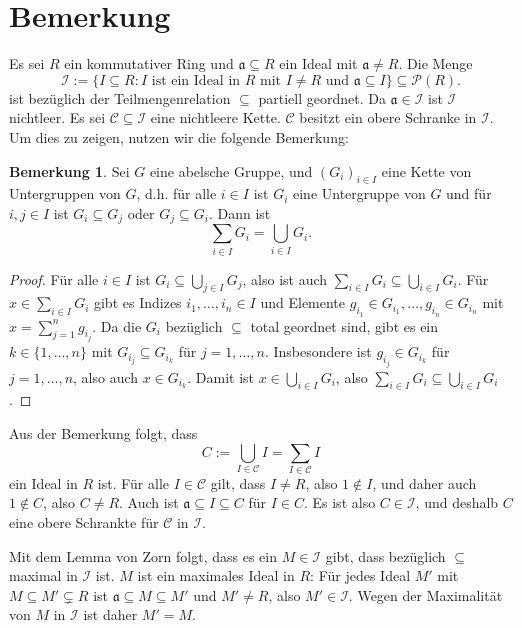 \documentclass[a4paper,10pt]{article}
\theoremstyle{definition}
\newtheorem{bem}[beh]{Bemerkung}
\newcommand{\mf}[1]{\mathfrak{#1}}
\newcommand{\mc}[1]{\mathcal{#1}}
\begin{document}
\section*{Bemerkung}
Es sei $R$ ein kommutativer Ring und $\mf{a} \subseteq R$ ein Ideal mit $\mf{a} \neq R$. Die Menge
\[
 \mc{I} := \{I \subseteq R : I \text{ ist ein Ideal in $R$ mit $I \neq R$ und $\mf{a} \subseteq I$} \} \subseteq \mc{P}(R).
\]
ist bezüglich der Teilmengenrelation $\subseteq$ partiell geordnet. Da $\mf{a} \in \mc{I}$ ist $\mc{I}$ nichtleer. Es sei $\mc{C} \subseteq \mc{I}$ eine nichtleere Kette. $\mc{C}$ besitzt ein obere Schranke in $\mc{I}$. Um dies zu zeigen, nutzen wir die folgende Bemerkung:

\begin{bem}
 Sei $G$ eine abelsche Gruppe, und $(G_i)_{i \in I}$ eine Kette von Untergruppen von $G$, d.h. für alle $i \in I$ ist $G_i$ eine Untergruppe von $G$ und für $i,j \in I$ ist $G_i \subseteq G_j$ oder $G_j \subseteq G_i$. Dann ist
 \[
  \sum_{i \in I} G_i = \bigcup_{i \in I} G_i.
 \]
\end{bem}
\begin{proof}
 Für alle $i \in I$ ist $G_i \subseteq \bigcup_{j \in I} G_j$, also ist auch $\sum_{i \in I} G_i \subseteq \bigcup_{i \in I} G_i$. Für $x \in \sum_{i \in I} G_i$ gibt es Indizes $i_1, \ldots, i_n \in I$ und Elemente $g_{i_1} \in G_{i_1}, \ldots, g_{i_n} \in G_{i_n}$ mit $x = \sum_{j=1}^n g_{i_j}$. Da die $G_i$ bezüglich $\subseteq$ total geordnet sind, gibt es ein $k \in \{1, \ldots, n\}$ mit $G_{i_j} \subseteq G_{i_k}$ für $j=1,\ldots,n$. Insbesondere ist $g_{i_j} \in G_{i_k}$ für $j=1,\ldots,n$, also auch $x \in G_{i_k}$. Damit ist $x \in \bigcup_{i \in I} G_i$, also $\sum_{i \in I} G_i \subseteq \bigcup_{i \in I} G_i$.
\end{proof}

Aus der Bemerkung folgt, dass
\[
 C := \bigcup_{I \in \mc{C}} I = \sum_{I \in \mc{C}} I
\]
ein Ideal in $R$ ist.
Für alle $I \in \mc{C}$ gilt, dass $I \neq R$, also $1 \not\in I$, und daher auch $1 \not\in C$, also $C \neq R$. Auch ist $\mf{a} \subseteq I \subseteq C$ für $I \in C$. Es ist also $C \in \mc{I}$, und deshalb $C$ eine obere Schrankte für $\mc{C}$ in $\mc{I}$.

Mit dem Lemma von Zorn folgt, dass es ein $M \in \mc{I}$ gibt, dass bezüglich $\subseteq$ maximal in $\mc{I}$ ist. $M$ ist ein maximales Ideal in $R$: Für jedes Ideal $M'$ mit $M \subseteq M' \subsetneq R$ ist $\mf{a} \subseteq M \subseteq M'$ und $M' \neq R$, also $M' \in \mc{I}$. Wegen der Maximalität von $M$ in $\mc{I}$ ist daher $M' = M$.
\end{document}
